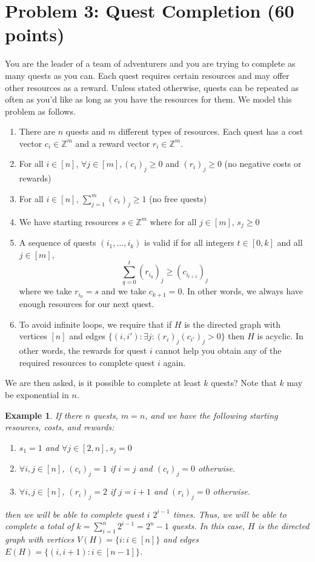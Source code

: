 \documentclass[12pt]{article}
\newtheorem{example}[theorem]{Example}
\begin{document}
\section*{Problem 3: Quest Completion (60 points)}
You are the leader of a team of adventurers and you are trying to complete as many quests as you can. Each quest requires certain resources and may offer other resources as a reward. Unless stated otherwise, quests can be repeated as often as you'd like as long as you have the resources for them. We model this problem as follows.
\begin{enumerate}
\item There are $n$ quests and $m$ different types of resources. Each quest has a cost vector $c_i \in \mathbb{Z}^{m}$ and a reward vector $r_i \in \mathbb{Z}^{m}$.
\item For all $i \in [n]$, $\forall j \in [m], (c_i)_j \geq 0$ and $ (r_i)_j \geq 0$ (no negative costs or rewards)
\item For all $i \in [n]$, $\sum_{j=1}^{m}{(c_i)_j} \geq 1$ (no free quests)
\item We have starting resources $s \in \mathbb{Z}^m$ where for all $j \in [m]$, $s_j \geq 0$
\item A sequence of quests $(i_1,\ldots,i_k)$ is valid if for all integers $t \in [0,k]$ and all $j \in [m]$, 
\[
\sum_{q = 0}^{t}{(r_{i_q})_j} \geq (c_{i_{t+1}})_j
\]
where we take $r_{i_0} = s$ and we take $c_{k+1} = 0$. In other words, we always have enough resources for our next quest.
\item To avoid infinite loops, we require that if $H$ is the directed graph with vertices $[n]$ and edges $\{(i,i'): \exists j: (r_i)_j(c_{i'})_j > 0\}$ then $H$ is acyclic. In other words, the rewards for quest $i$ cannot help you obtain any of the required resources to complete quest $i$ again.
\end{enumerate}
We are then asked, is it possible to complete at least $k$ quests? Note that $k$ may be exponential in $n$.
\begin{example}
If there $n$ quests, $m = n$, and we have the following starting resources, costs, and rewards:
\begin{enumerate}
\item $s_1 = 1$ and $\forall j \in [2,n], s_j = 0$
\item $\forall i,j \in [n]$, $(c_i)_j = 1$ if $i = j$ and $(c_i)_j = 0$ otherwise.
\item $\forall i,j \in [n]$, $(r_i)_j = 2$ if $j = i+1$ and $(r_i)_j = 0$ otherwise.
\end{enumerate}
then we will be able to complete quest $i$ $2^{i-1}$ times. Thus, we will be able to complete a total of $k = \sum_{i=1}^{n}{2^{i-1}} = 2^n - 1$ quests. In this case, $H$ is the directed graph with vertices $V(H) = \{i: i \in [n]\}$ and edges $E(H) = \{(i,i+1): i \in [n-1]\}$.
\end{example}
\end{document}
